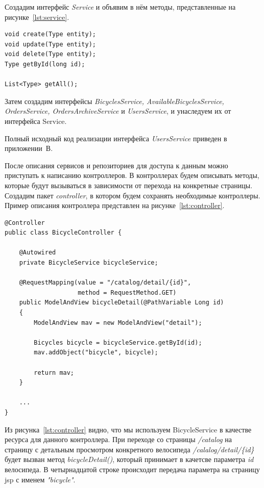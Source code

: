 Создадим интерфейс
\textit{Service} и объявим в нём методы, представленные на рисунке~\ref{lst:service}.

\begin{lstlisting}[caption=Объявленные в интерфейсе Service методы,label=lst:service]
void create(Type entity);
void update(Type entity);
void delete(Type entity);
Type getById(long id);

List<Type> getAll();
\end{lstlisting}

Затем создадим интерфейсы \textit{BicyclesService, AvailableBicyclesService,
OrdersService, OrdersArchiveService} и \textit{UsersService}, и унаследуем их от
интерфейса Service.

Полный исходный код реализации интерфейса \textit{UsersService} приведен в приложении~В.

После описания сервисов и репозиториев для доступа к данным можно приступать
к написанию контроллеров. В контроллерах будем описывать методы, которые будут
вызываться в зависимости от перехода на конкретные страницы. Создадим пакет
\textit{controller}, в котором будем сохранять необходимые контроллеры. Пример описания
контроллера представлен на рисунке~\ref{lst:controller}.

\begin{lstlisting}[caption=Пример описания контроллера BicycleController,label=lst:controller]
@Controller
public class BicycleController {

    @Autowired
    private BicycleService bicycleService;

    @RequestMapping(value = "/catalog/detail/{id}",
                    method = RequestMethod.GET)
    public ModelAndView bicycleDetail(@PathVariable Long id)
    {
        ModelAndView mav = new ModelAndView("detail");

        Bicycles bicycle = bicycleService.getById(id);
        mav.addObject("bicycle", bicycle);

        return mav;
    }

    ...
}
\end{lstlisting}

Из рисунка~\ref{lst:controller} видно, что мы используем BicycleService в качестве ресурса
для данного контроллера. При переходе
со страницы \textit{/catalog} на страницу с детальным просмотром конкретного велосипеда
\textit{/calalog/detail/\{id\}} будет вызван метод \textit{bicycleDetail()}, который принимает в
качетсве параметра \textit{id} велосипеда. В четырнадцатой строке происходит передача параметра
на страницу jsp с именем \textit{"bicycle"}.

